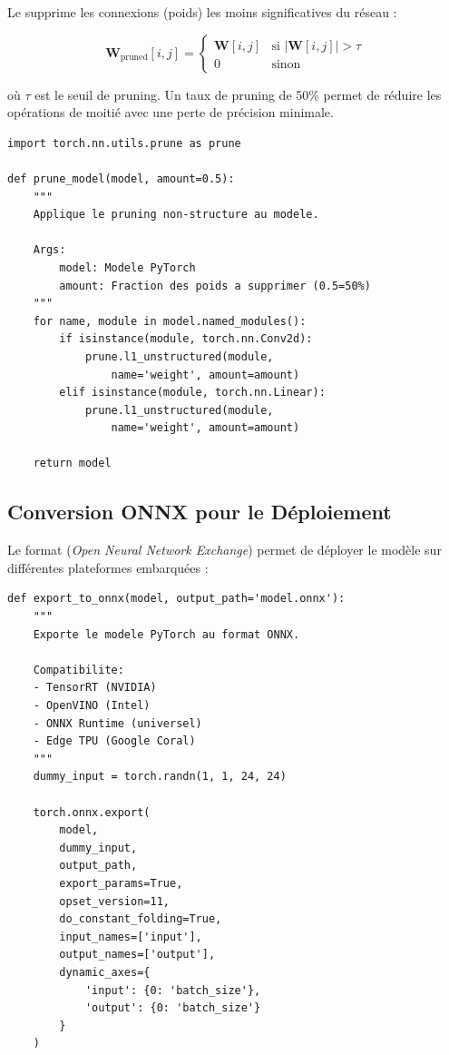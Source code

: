Le  supprime les connexions (poids) les moins significatives du réseau :

\begin{equation}
\mathbf{W}_{\text{pruned}}[i, j] = \begin{cases}
    \mathbf{W}[i, j] & \text{si } |\mathbf{W}[i, j]| > \tau \\
    0 & \text{sinon}
\end{cases}
\label{eq:pruning}
\end{equation}

où $\tau$ est le seuil de pruning. Un taux de pruning de 50\% permet de réduire les opérations de moitié avec une perte de précision minimale.

\begin{lstlisting}[style=pythonstyle, caption={Pruning structuré du CNN.}, label={lst:pruning}]
import torch.nn.utils.prune as prune

def prune_model(model, amount=0.5):
    """
    Applique le pruning non-structure au modele.
    
    Args:
        model: Modele PyTorch
        amount: Fraction des poids a supprimer (0.5=50%)
    """
    for name, module in model.named_modules():
        if isinstance(module, torch.nn.Conv2d):
            prune.l1_unstructured(module, 
                name='weight', amount=amount)
        elif isinstance(module, torch.nn.Linear):
            prune.l1_unstructured(module, 
                name='weight', amount=amount)
    
    return model
\end{lstlisting}

\subsection{Conversion ONNX pour le Déploiement}

Le format  (\textit{Open Neural Network Exchange}) permet de déployer le modèle sur différentes plateformes embarquées :

\begin{lstlisting}[style=pythonstyle, caption={Export du modèle au format ONNX.}, label={lst:onnx_export}]
def export_to_onnx(model, output_path='model.onnx'):
    """
    Exporte le modele PyTorch au format ONNX.
    
    Compatibilite:
    - TensorRT (NVIDIA)
    - OpenVINO (Intel)
    - ONNX Runtime (universel)
    - Edge TPU (Google Coral)
    """
    dummy_input = torch.randn(1, 1, 24, 24)
    
    torch.onnx.export(
        model,
        dummy_input,
        output_path,
        export_params=True,
        opset_version=11,
        do_constant_folding=True,
        input_names=['input'],
        output_names=['output'],
        dynamic_axes={
            'input': {0: 'batch_size'},
            'output': {0: 'batch_size'}
        }
    )
\end{lstlisting}

